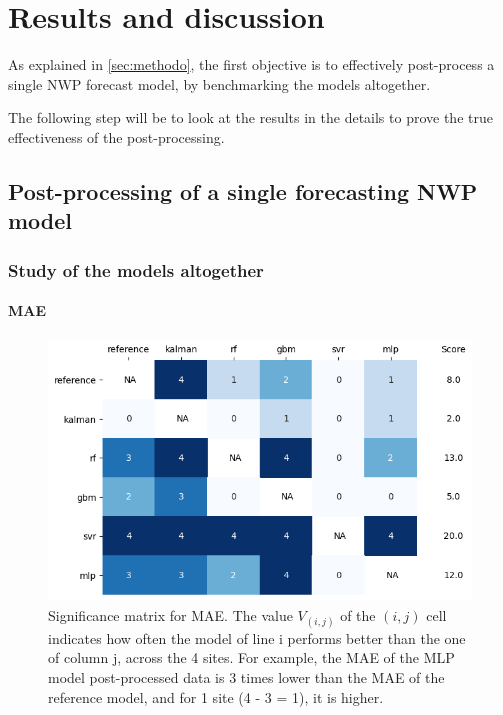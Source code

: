 \section{Results and discussion}

As explained in \ref{sec:methodo}, the first objective is to effectively post-process a single NWP forecast model, by benchmarking the models altogether. 

The following step will be to look at the results in the details to prove the true effectiveness of the post-processing.
\subsection{Post-processing of a single forecasting NWP model}
\subsubsection{Study of the models altogether} 
\paragraph{MAE}
\begin{figure}[htb!]
    \centering
    \includegraphics[width=\columnwidth]{figures/first_study/significance_matrix_mae.png}
\caption{Significance matrix for MAE. The value $V_{(i,j)}$ of the $(i,j)$ cell indicates how often the model of line i performs better than the one of column j, across the 
4 sites. For example, the MAE of the MLP model post-processed data is 3 times lower than the MAE of the reference model, and for 1 site (4 - 3 = 1), it is higher.}
\end{figure}


